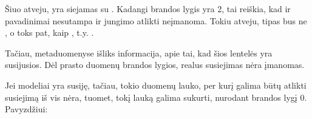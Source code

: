 \documentclass[letterpaper,10pt,lithuanian]{sphinxmanual}
\begin{document}
\sphinxAtStartPar
Šiuo atveju,  yra siejamas su . Kadangi
 brandos lygis yra 2, tai reiškia, kad  ir
 pavadinimai nesutampa ir jungimo atlikti neįmanoma. Tokiu
atveju,  tipas bus ne , o toks pat, kaip ,
t.y. .

\sphinxAtStartPar
Tačiau, metaduomenyse išliks informacija, apie tai, kad šios lentelės yra
susijusios. Dėl prasto duomenų brandos lygios, realus susiejimas nėra
įmanomas.

\sphinxAtStartPar
Jei modeliai yra susiję, tačiau, tokio duomenų lauko, per kurį galima būtų
atlikti susiejimą iš vis nėra, tuomet, tokį lauką galima sukurti, nurodant
brandos lygį 0. Pavyzdžiui:
\end{document}
